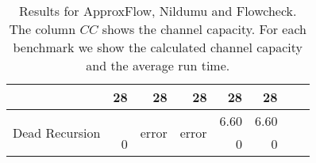 \begin{table}[]
\begin{tabular}{rr|rr|rr|rr}
                                      & \textbf{28}   & \textbf{28}            & \textbf{28}            & \textbf{28}   & \textbf{28}  &                &               \\ \hline
\multirow{2}{*}{Dead Recursion}       &               & \multirow{2}{*}{error} & \multirow{2}{*}{error} & 6.60          & 6.60         &                &               \\
                                      & 0             &                        &                        & 0             & 0            &                &              
\end{tabular}
\caption{Results for ApproxFlow, Nildumu and Flowcheck. The column $CC$ shows the channel capacity. For each benchmark we show the calculated channel capacity and the average run time.}\label{tab:othertools}
\end{table}



